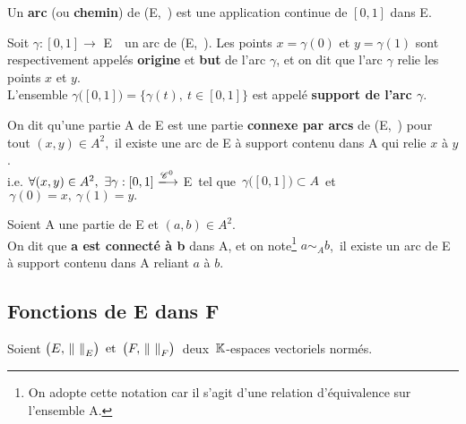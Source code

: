 Un \textbf{arc} (ou \textbf{chemin}) de (E,\ \normtxt{\ }) est une application continue de \([0,1]\) dans E.

\vspace{0.3cm}

Soit \(\gamma  : [0,1] \to \) E\ \ un arc de (E,\ \normtxt{\ }). Les points \(x=\gamma(0)\) et \(y=\gamma(1)\) sont respectivement appelés \textbf{origine} et \textbf{but} de l'arc \(\gamma\), et on dit que l'arc \(\gamma\) relie les points \(x\) et \(y\).\vspace{0.1cm}\\
L'ensemble \(\gamma \bigl( [0,1] \bigr) = \{ \gamma(t),\ t\in [0,1] \} \) est appelé \textbf{support de l'arc \(\gamma\)}. 

\vspace{1cm}

On dit qu'une partie A de E est une partie \textbf{connexe par arcs} de (E,\ \normtxt{\ }) \ssi pour tout \((x,y)\in A^2,\) il existe une arc de E à support contenu dans A qui relie \(x\) à \(y\).\vspace{0.1cm}\\
i.e. \(\forall(x,y)\in A^2,\ \exists \gamma : [0,1] \xlongrightarrow{\mathscr{C}^0} \) E\, tel que \(\,\gamma \bigl( [0,1] \bigr) \subset A\,\) et \(\,\gamma(0)=x,\ \gamma(1)=y. \)
\vspace{01cm}

Soient A une partie de E et \((a,b)\in A^2\).\\
On dit que \textbf{a est connecté à b} dans A, et on note\footnote{On adopte cette notation car il s'agit d'une relation d'équivalence sur l'ensemble A.} \(a\sim_A b\),\, \ssi il existe un arc de E à support contenu dans A reliant $a$ à $b$.

\vspace{2cm}

\subsection{Fonctions de E dans F}

\vspace{0.5cm}
\begin{center}
    Soient \(\bigl(E,\, \norm{\ }_E\bigr)\,\text{ et }\, \bigl(F,\, \norm{\ }_F\bigr)\,\) deux $\,\mathbb{K}$-espaces vectoriels normés.
\end{center}
\vspace{0.5cm}

